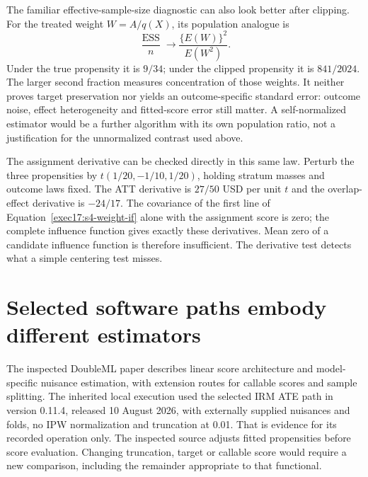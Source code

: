 The familiar effective-sample-size diagnostic can also look better after
clipping. For the treated weight $W=A/q(X)$, its population analogue is
\[
 \frac{\operatorname{ESS}}{n}\longrightarrow
       \frac{\{E(W)\}^2}{E(W^2)}.
\]
Under the true propensity it is $9/34$; under the clipped propensity it is
$841/2024$. The larger second fraction measures concentration of those
weights. It neither proves target preservation nor yields an outcome-specific
standard error: outcome noise, effect heterogeneity and fitted-score error
still matter. A self-normalized estimator would be a further algorithm with
its own population ratio, not a justification for the unnormalized contrast
used above.

The assignment derivative can be checked directly in this same law. Perturb
the three propensities by $t(1/20,-1/10,1/20)$, holding stratum masses and
outcome laws fixed. The ATT derivative is $27/50$ USD per unit $t$ and the
overlap-effect derivative is $-24/17$. The covariance of the first line of
Equation~\eqref{exec17:s4-weight-if} alone with the assignment score is zero;
the complete influence function gives exactly these derivatives. Mean zero
of a candidate influence function is therefore insufficient. The derivative
test detects what a simple centering test misses.\citep{exec17_s4_math}

\section{Selected software paths embody different estimators}
\label{exec17:s4-paths}

The inspected DoubleML paper describes linear score architecture and
model-specific nuisance estimation, with extension routes for callable scores
and sample splitting. The inherited local execution used the selected IRM
ATE path in version 0.11.4, released 10 August 2026, with externally supplied
nuisances and folds, no IPW normalization and truncation at 0.01. That is
evidence for its recorded operation only. The inspected source adjusts fitted
propensities before score evaluation. Changing truncation, target or callable
score would require a new comparison, including the remainder appropriate to
that functional.\citep{doubleml2022,runtime_doubleml_scope,exec17_s4_paths}

